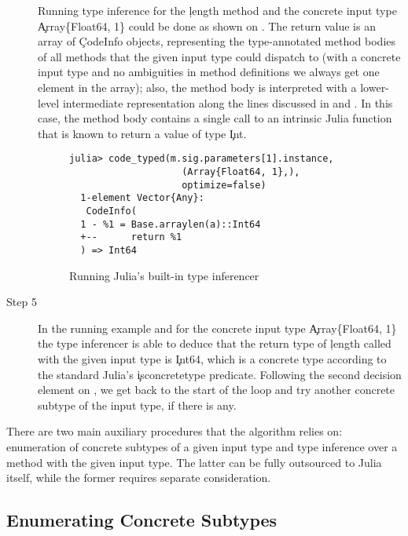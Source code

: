 \begin{description}
  Running type inference for the \c{length} method and the concrete input type
  \c{Array\{Float64, 1\}} could be done as shown on .
  The return value is an array of \c{CodeInfo} objects, representing
  the type-annotated method bodies of all methods that the given input type
  could dispatch to (with a concrete input type and no ambiguities in method
  definitions we always get one element in the array); also, the method body is
  interpreted with a lower-level intermediate representation along the lines
  discussed in  and . In this case, the
  method body contains a single call to an intrinsic Julia function that is
  known to return a value of type \c{Int}.

  \begin{figure}[hbt]
\begin{lstlisting}[style=jterm]
  julia> code_typed(m.sig.parameters[1].instance,
                    (Array{Float64, 1},),
                    optimize=false)
  1-element Vector{Any}:
   CodeInfo(
  1 - %1 = Base.arraylen(a)::Int64
  +--      return %1
  ) => Int64
\end{lstlisting}
    \caption{Running Julia's built-in type inferencer}%
    \label{fig:julia-type-infer}
  \end{figure}

  \item[Step 5] In the running example and for the concrete input type \c{Array\{Float64, 1\}}
  the type inferencer is able to deduce that the return type of \c{length}
  called with the given input type is \c{Int64}, which is a concrete type
  according to the standard Julia's \c{isconcretetype} predicate.
  Following the second decision element on , we get back to
  the start of the loop and try another concrete subtype of the input type,
  if there is any.
\end{description}

There are two main auxiliary procedures that the algorithm relies on: enumeration of
concrete subtypes of a given input type and type inference over a method with the
given input type. The latter can be fully outsourced to Julia itself, while the
former requires separate consideration.

\subsection{Enumerating Concrete Subtypes}%
\label{sec:approx:enu}

